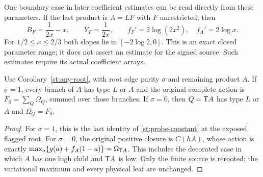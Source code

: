 One boundary case in later coefficient estimates can
be read directly from these parameters. If the last
product is $A=LF$ with $F$ unrestricted, then
\[
 B_F=\frac1{2x}-x,\qquad Y_F=\frac1{2x},\qquad
 f_F'=2\log(2x^2),\quad f_A'=2\log x .
\]
For $1/2\le x\le2/3$ both slopes lie in
$[-2\log2,0]$. This is an exact closed parameter
range; it does not assert an estimate for the
signed source. Such estimates require its actual
coefficient arrays.

\begin{corollary}\label{st:root-budget}
Use Corollary~\ref{st:any-root}, with root edge parity
$\sigma$ and remaining product $A$.
If $\sigma=1$, every branch of $A$ has type $L$ or
$A$ and the original complete action is
$F_0=\sum_Q\Omega_Q$, summed over those branches.
If $\sigma=0$, then $Q=\mathsf T A$ has type $L$ or $A$
and $\Omega_Q=F_0$.
\end{corollary}
\begin{proof}
For $\sigma=1$, this is the last identity of
\eqref{st:probe-constant} at the exposed flagged
root. For $\sigma=0$, the original positive closure
is $C(hA)$, whose action is exactly
$\max_a\{g(a)+f_A(1-a)\}=\Omega_{\mathsf T A}$.
This includes the decorated case in which $A$
has one high child and $\mathsf T A$ is low.
Only the finite source is rerooted; the variational
maximum and every physical leaf are unchanged.
\end{proof}

